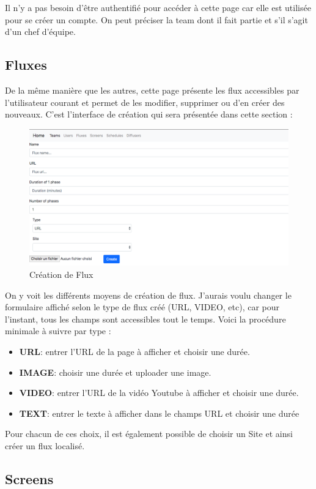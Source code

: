 \documentclass[french]{article}
\begin{document}
Il n'y a pas besoin d'être authentifié pour accéder à cette page car elle est utilisée pour se créer un compte. On peut préciser la team dont il fait partie et s'il s'agit d'un chef d'équipe.

\subsection{Fluxes}

De la même manière que les autres, cette page présente les flux accessibles par l'utilisateur courant et permet de les modifier, supprimer ou d'en créer des nouveaux. C'est l'interface de création qui sera présentée dans cette section :

\begin{figure}[h]
	\centering	
	\includegraphics[width=0.8\linewidth]{interface/fluxpage_creation.png}%
	\caption{Création de Flux}
\end{figure} 

On y voit les différents moyens de création de flux. J'aurais voulu changer le formulaire affiché selon le type de flux créé (URL, VIDEO, etc), car pour l'instant, tous les champs sont accessibles tout le temps. Voici la procédure minimale à suivre par type :
\begin{itemize}
	\item \textbf{URL}: entrer l'URL de la page à afficher et choisir une durée.
	\item \textbf{IMAGE}: choisir une durée et uploader une image.
	\item \textbf{VIDEO}: entrer l'URL de la vidéo Youtube à afficher et choisir une durée.
	\item \textbf{TEXT}: entrer le texte à afficher dans le champs URL et choisir une durée 
\end{itemize}
Pour chacun de ces choix, il est également possible de choisir un Site et ainsi créer un flux localisé.

\subsection{Screens}
\end{document}
